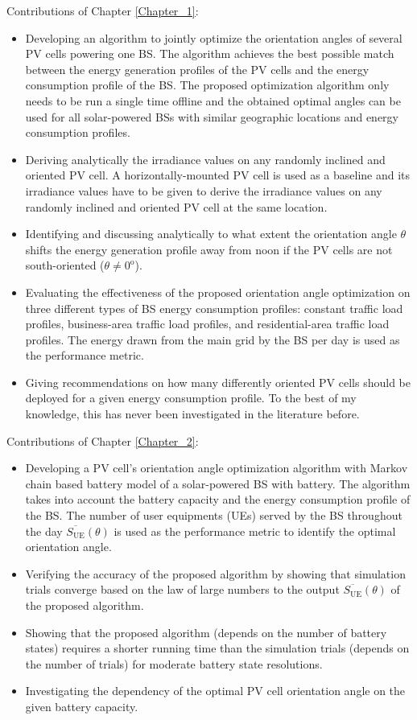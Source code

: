 Contributions of Chapter \ref{Chapter_1}:

\begin{itemize}
\item Developing an algorithm to jointly optimize the orientation angles of several PV cells powering one BS. The algorithm achieves the best possible match between the energy generation profiles of the PV cells and the energy consumption profile of the BS. The proposed optimization algorithm only needs to be run a single time offline and the obtained optimal angles can be used for all solar-powered BSs with similar geographic locations and energy consumption profiles.
\item Deriving analytically the irradiance values on any randomly inclined and oriented PV cell. A horizontally-mounted PV cell is used as a baseline and its irradiance values have to be given to derive the irradiance values on any randomly inclined and oriented PV cell at the same location.
\item Identifying and discussing analytically to what extent the orientation angle $\theta$ shifts the energy generation profile away from noon if the PV cells are not south-oriented ($\theta \neq 0^\mathrm{o}$).  
\item Evaluating the effectiveness of the proposed orientation angle optimization on three different types of BS energy consumption profiles: constant traffic load profiles, business-area traffic load profiles, and residential-area traffic load profiles. The energy drawn from the main grid by the BS per day is used as the performance metric.
\item Giving recommendations on how many differently oriented PV cells should be deployed for a given energy consumption profile. To the best of my knowledge, this has never been investigated in the literature before.
\end{itemize}


Contributions of Chapter \ref{Chapter_2}:



\begin {itemize}
\item Developing a PV cell’s orientation angle optimization algorithm with Markov chain based battery model of a solar-powered BS with battery. The algorithm takes into account the battery capacity and the energy consumption profile of the BS. The number of user equipments (UEs) served by the BS throughout the day $\overline{S_{\mathrm{UE}}}(\theta)$ is used as the performance metric to identify the optimal orientation angle.
\item Verifying the accuracy of the proposed algorithm by showing that simulation trials converge based on the law of large numbers to 
the output $\overline{S_{\mathrm{UE}}}(\theta)$ of the proposed algorithm. 
\item Showing that the proposed algorithm (depends on the number of battery states) requires a shorter running time than the simulation trials (depends on the number of trials) for moderate battery state resolutions.
\item Investigating the dependency of the optimal PV cell orientation angle on the given battery capacity.
\end {itemize}


